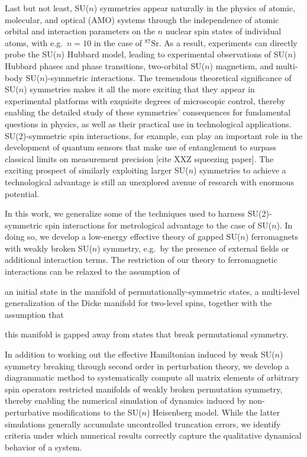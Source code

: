 \documentclass[nofootinbib,notitlepage,11pt]{revtex4-2}
\newcommand{\1}{\mathds{1}}
\newcommand{\red}[1]{{\color{red} #1}}
\begin{document}
Last but not least, SU($n$) symmetries appear naturally in the physics
of atomic, molecular, and optical (AMO)
systems\cite{gorshkov2010twoorbital, beverland2016realizing,
  cazalilla2014ultracold, taie2012su, hofrichter2016direct,
  cappellini2014direct, scazza2014observation, zhang2014spectroscopic,
  goban2018emergence, perlin2019effective} through the independence of
atomic orbital and interaction parameters on the $n$ nuclear spin
states of individual atoms, with e.g.~$n=10$ in the case of
${}^{87}$Sr.  As a result, experiments can directly probe the SU($n$)
Hubbard model, leading to experimental observations of SU($n$) Hubbard
phases and phase transitions\cite{taie2012su, hofrichter2016direct},
two-orbital SU($n$) magnetism\cite{cappellini2014direct,
  scazza2014observation, zhang2014spectroscopic}, and multi-body
SU($n$)-symmetric interactions\cite{goban2018emergence,
  perlin2019effective}.  The tremendous theoretical significance of
SU($n$) symmetries makes it all the more exciting that they appear in
experimental platforms with exquisite degrees of microscopic control,
thereby enabling the detailed study of these symmetries' consequences
for fundamental questions in physics, as well as their practical use
in technological applications.  SU(2)-symmetric spin interactions, for
example, can play an important role in the development of quantum
sensors that make use of entanglement to surpass classical limits on
measurement precision\cite{he2019engineering}\red{[cite XXZ squeezing
  paper]}.  The exciting prospect of similarly exploiting larger
SU($n$) symmetries to achieve a technological advantage is still an
unexplored avenue of research with enormous potential.

In this work, we generalize some of the techniques used to harness
SU(2)-symmetric spin interactions for metrological advantage to the
case of SU($n$).  In doing so, we develop a low-energy effective
theory of gapped SU($n$) ferromagnets with weakly broken SU($n$)
symmetry, e.g.~by the presence of external fields or additional
interaction terms.  The restriction of our theory to ferromagnetic
interactions can be relaxed to the assumption of
\begin{enumerate*}
\item an initial state in the manifold of permutationally-symmetric
  states, a multi-level generalization of the Dicke manifold for
  two-level spins, together with the assumption that
\item this manifold is gapped away from states that break
  permutational symmetry.
\end{enumerate*}
In addition to working out the effective Hamiltonian induced by weak
SU($n$) symmetry breaking through second order in perturbation theory,
we develop a diagrammatic method to systematically compute all matrix
elements of arbitrary spin operators restricted manifolds of weakly
broken permutation symmetry, thereby enabling the numerical simulation
of dynamics induced by non-perturbative modifications to the SU($n$)
Heisenberg model.  While the latter simulations generally accumulate
uncontrolled truncation errors, we identify criteria under which
numerical results correctly capture the qualitative dynamical behavior
of a system.
\end{document}
